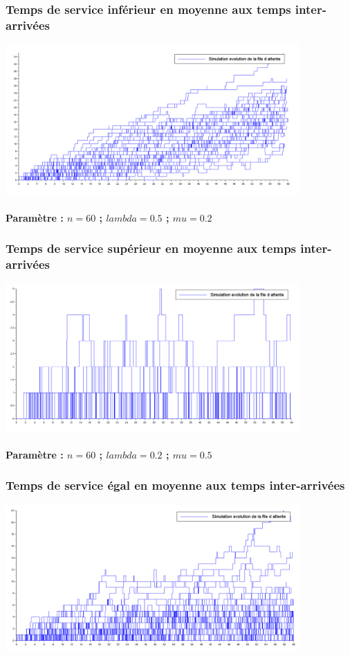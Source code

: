 \documentclass{article}
\begin{document}
\subsubsection{Temps de service inférieur en moyenne aux temps inter-arrivées}
\begin{center}
\includegraphics[width=425px]{img/inf.png}
\end{center}
\paragraph{Paramètre : $n=60$ ; $lambda=0.5$ ; $mu=0.2$}

\subsubsection{Temps de service supérieur en moyenne aux temps inter-arrivées}
\begin{center}
\includegraphics[width=425px]{img/sup.png}
\end{center}
\paragraph{Paramètre : $n=60$ ; $lambda=0.2$ ; $mu=0.5$}

\subsubsection{Temps de service égal en moyenne aux temps inter-arrivées}
\begin{center}
\includegraphics[width=425px]{img/egal.png}
\end{center}
\end{document}
